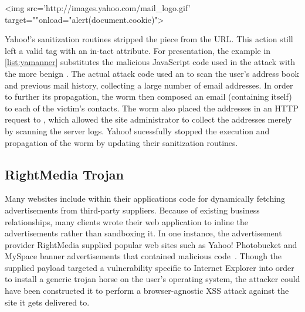 \begin{jscode}
<img src='http://images.yahoo.com/mail_logo.gif'
  target=""onload="alert(document.cookie)">
\end{jscode}

Yahoo!'s sanitization routines stripped the  piece from the URL.
This action still left a valid  tag with an in-tact  attribute.
For presentation, the example in \autoref{list:yamanner} substitutes the malicious JavaScript code used in the attack with the more benign .
The actual attack code used an  to scan the user's address book and previous mail history, collecting a large number of email addresses.
In order to further its propagation, the worm then composed an email (containing itself) to each of the victim's contacts.
The worm also placed the addresses in an HTTP request to , which allowed the site administrator to collect the addresses merely by scanning the server logs.
Yahoo! sucessfully stopped the execution and propagation of the worm by updating their sanitization routines.

\subsection{RightMedia Trojan}\label{sec:advertisement}
Many websites include within their applications code for dynamically fetching advertisements from third-party suppliers.
Because of existing business relationships, many clients wrote their web application to inline the advertisements rather than sandboxing it.
In one instance, the advertisement provider RightMedia supplied popular web sites such as Yahoo! Photobucket and MySpace banner advertisements that contained malicious code~\cite{adjacking}.
Though the supplied payload targeted a vulnerability specific to Internet Explorer into order to install a generic trojan horse on the user's operating system, the attacker could have been constructed it to perform a browser-agnostic XSS attack against the site it gets delivered to.

